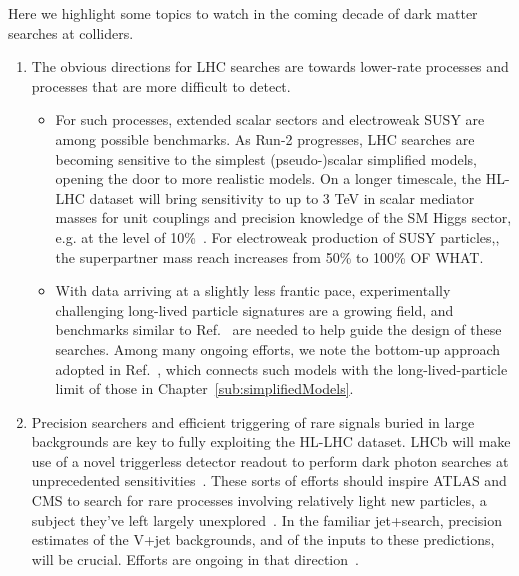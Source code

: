 Here we highlight some topics to watch in the coming decade of dark matter searches at colliders.

\begin{issues}
\begin{enumerate}

\item The obvious directions for LHC searches are towards lower-rate processes and processes that are more difficult to detect.

\begin{itemize} 

\item For such processes, extended scalar sectors and electroweak SUSY are among possible benchmarks. As Run-2 progresses, LHC searches are becoming sensitive to the simplest (pseudo-)scalar simplified models, opening the door to more realistic models.
On a longer timescale, the HL-LHC dataset will bring sensitivity to up to 3 TeV in scalar mediator masses for unit couplings and precision knowledge of the SM Higgs sector, e.g. at the level of 10\%~\cite{Campana:2016cqm}.
For electroweak production of SUSY particles,, the superpartner mass reach increases from 50\% to 100\% OF WHAT.

\item With data arriving at a slightly less frantic pace, experimentally challenging long-lived particle signatures are a growing field, and benchmarks similar to Ref.~\cite{Abercrombie:2015wmb} are needed to help guide the design of these searches. Among many ongoing efforts, we note the bottom-up approach adopted in Ref.~\cite{Buchmueller:2017uqu}, which connects such models with the long-lived-particle limit of those in Chapter~\ref{sub:simplifiedModels}. 

\end{itemize} 

\item Precision searchers and efficient triggering of rare signals buried in large backgrounds are key to fully exploiting the HL-LHC dataset.
  LHCb will make use of a novel triggerless detector readout to perform dark photon searches at unprecedented sensitivities~\cite{Ilten:2016tkc}.
  These sorts of efforts should inspire ATLAS and CMS to search for rare processes involving relatively light new particles, a subject they've left largely unexplored~\cite{Alves:2016cqf}.
  In the familiar jet+\MET search, precision estimates of the V+jet backgrounds, and of the inputs to these predictions, will be crucial. Efforts are ongoing in that direction~\cite{Blumenschein:2018gtm}. 


\end{enumerate}
\end{issues}
